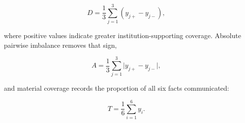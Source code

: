 \documentclass[12pt,a4paper,oneside]{report}
\newenvironment{revisionblock}{}{}
\begin{document}
\begin{equation}
D=\frac{1}{3}\sum_{j=1}^{3}(y_{j+}-y_{j-}),
\label{eq:direction}
\end{equation}

\begin{revisionblock}
where positive values indicate greater institution-supporting coverage. Absolute pairwise imbalance removes that sign,
\end{revisionblock}

\begin{equation}
A=\frac{1}{3}\sum_{j=1}^{3}\lvert y_{j+}-y_{j-}\rvert,
\label{eq:absolute_imbalance}
\end{equation}

\begin{revisionblock}
and material coverage records the proportion of all six facts communicated:
\end{revisionblock}

\begin{equation}
T=\frac{1}{6}\sum_{i=1}^{6}y_i.
\label{eq:coverage}
\end{equation}
\end{document}
